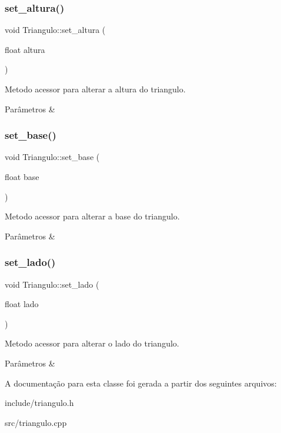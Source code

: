 \subsubsection{\texorpdfstring{set\+\_\+altura()}{set\_altura()}}
{\footnotesize\ttfamily void Triangulo\+::set\+\_\+altura (\begin{DoxyParamCaption}\item[{float}]{altura }\end{DoxyParamCaption})}



Metodo acessor para alterar a altura do triangulo. 


\begin{DoxyParams}{Parâmetros}
{\em } & \\
\hline
\end{DoxyParams}
\mbox{\label{classTriangulo_ae966bb0f31c5d2f5743fb3beffa84c28}} 
\subsubsection{\texorpdfstring{set\+\_\+base()}{set\_base()}}
{\footnotesize\ttfamily void Triangulo\+::set\+\_\+base (\begin{DoxyParamCaption}\item[{float}]{base }\end{DoxyParamCaption})}



Metodo acessor para alterar a base do triangulo. 


\begin{DoxyParams}{Parâmetros}
{\em } & \\
\hline
\end{DoxyParams}
\mbox{\label{classTriangulo_a83ef4ab9aecb441ef81603227d4dd141}} 
\subsubsection{\texorpdfstring{set\+\_\+lado()}{set\_lado()}}
{\footnotesize\ttfamily void Triangulo\+::set\+\_\+lado (\begin{DoxyParamCaption}\item[{float}]{lado }\end{DoxyParamCaption})}



Metodo acessor para alterar o lado do triangulo. 


\begin{DoxyParams}{Parâmetros}
{\em } & \\
\hline
\end{DoxyParams}


A documentação para esta classe foi gerada a partir dos seguintes arquivos\+:\begin{DoxyCompactItemize}
\item 
include/triangulo.\+h\item 
src/triangulo.\+cpp\end{DoxyCompactItemize}
